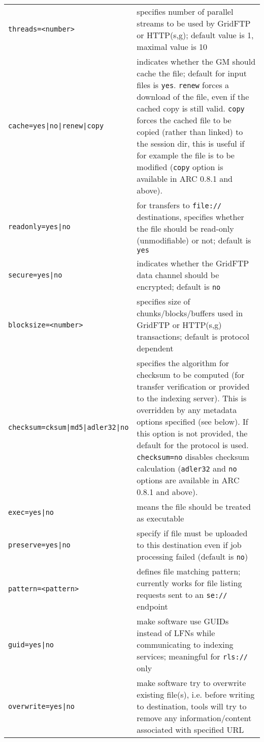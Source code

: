\begin{longtable}{lp{10cm}}
   \verb#threads=<number># & specifies number of parallel
   streams to be used by GridFTP or HTTP(s,g); default value is 1,
   maximal value is 10\\
   \verb#cache=yes|no|renew|copy# & indicates whether the GM should
   cache the file; default for input files is \verb#yes#. \verb#renew#
   forces a download of the file, even if the cached copy is still valid.
   \verb#copy# forces the cached file to be copied (rather than linked) to
   the session dir, this is useful if for example the file is to be modified (\verb#copy# option is available in ARC 0.8.1 and above).\\
   \verb#readonly=yes|no# & for transfers to \verb#file://# destinations,
    specifies whether the file should be
   read-only (unmodifiable) or not; default is \verb#yes# \\
   \verb#secure=yes|no# & indicates whether the GridFTP data
   channel should be encrypted; default is \verb#no#\\
   \verb#blocksize=<number># & specifies size of
   chunks/blocks/buffers used in GridFTP or HTTP(s,g) transactions;
   default is protocol dependent\\
   \verb#checksum=cksum|md5|adler32|no# & specifies the algorithm for checksum to be
   computed (for transfer verification or provided to the indexing server). This is overridden
   by any metadata options specified (see below). If this option is
   not provided, the default for the protocol is used. \verb#checksum=no#
   disables checksum calculation (\verb#adler32# and \verb#no# options are available in ARC 0.8.1 and above).\\
   \verb#exec=yes|no# & means the file should be treated as executable\\
   \verb#preserve=yes|no# & specify if file must be uploaded to this
   destination even if job processing failed (default is \verb#no#)\\
   \verb#pattern=<pattern># & defines file matching pattern; currently
   works for file listing requests sent to an \verb#se://# endpoint\\
   \verb#guid=yes|no# & make software use GUIDs instead of LFNs while
   communicating to indexing services; meaningful for \verb#rls://#
   only\\
   \verb#overwrite=yes|no# & make software try to overwrite existing
   file(s), i.e. before writing to destination, tools will try to remove
   any information/content associated with specified URL\\

\end{longtable}
